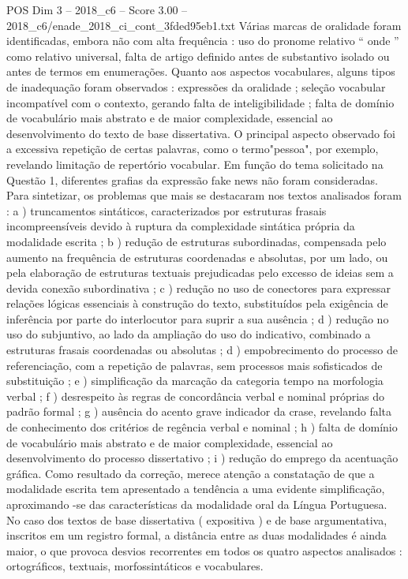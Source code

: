 \begin{textsample}{POS Dim 3 – 2018\_c6 – Score 3.00 – 2018\_c6/enade\_2018\_ci\_cont\_3fded95eb1.txt}
Várias marcas de oralidade foram identificadas, embora não com alta frequência : uso do pronome relativo “ onde ” como relativo universal, falta de artigo definido antes de substantivo isolado ou antes de termos em enumerações.
Quanto aos aspectos vocabulares, alguns tipos de inadequação foram observados : expressões da oralidade ; seleção vocabular incompatível com o contexto, gerando falta de inteligibilidade ; falta de domínio de vocabulário mais abstrato e de maior complexidade, essencial ao desenvolvimento do texto de base dissertativa.
O principal aspecto observado foi a excessiva repetição de certas palavras, como o termo"pessoa", por exemplo, revelando limitação de repertório vocabular.
Em função do tema solicitado na Questão 1, diferentes grafias da expressão fake news não foram consideradas.
Para sintetizar, os problemas que mais se destacaram nos textos analisados foram : a ) truncamentos sintáticos, caracterizados por estruturas frasais incompreensíveis devido à ruptura da complexidade sintática própria da modalidade escrita ; b ) redução de estruturas subordinadas, compensada pelo aumento na frequência de estruturas coordenadas e absolutas, por um lado, ou pela elaboração de estruturas textuais prejudicadas pelo excesso de ideias sem a devida conexão subordinativa ; c ) redução no uso de conectores para expressar relações lógicas essenciais à construção do texto, substituídos pela exigência de inferência por parte do interlocutor para suprir a sua ausência ; d ) redução no uso do subjuntivo, ao lado da ampliação do uso do indicativo, combinado a estruturas frasais coordenadas ou absolutas ; d ) empobrecimento do processo de referenciação, com a repetição de palavras, sem processos mais sofisticados de substituição ; e ) simplificação da marcação da categoria tempo na morfologia verbal ; f ) desrespeito às regras de concordância verbal e nominal próprias do padrão formal ; g ) ausência do acento grave indicador da crase, revelando falta de conhecimento dos critérios de regência verbal e nominal ; h ) falta de domínio de vocabulário mais abstrato e de maior complexidade, essencial ao desenvolvimento do processo dissertativo ; i ) redução do emprego da acentuação gráfica.
Como resultado da correção, merece atenção a constatação de que a modalidade escrita tem apresentado a tendência a uma evidente simplificação, aproximando -se das características da modalidade oral da Língua Portuguesa.
No caso dos textos de base dissertativa ( expositiva ) e de base argumentativa, inscritos em um registro formal, a distância entre as duas modalidades é ainda maior, o que provoca desvios recorrentes em todos os quatro aspectos analisados : ortográficos, textuais, morfossintáticos e vocabulares.

\end{textsample}
